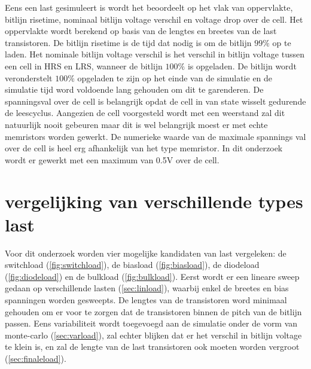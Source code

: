 Eens een last gesimuleert is wordt het beoordeelt op het vlak van oppervlakte, bitlijn risetime, nominaal bitlijn voltage verschil en voltage drop over de cell. Het oppervlakte wordt berekend op basis van de lengtes en breetes van de last transistoren. De bitlijn risetime is de tijd dat nodig is om de bitlijn $99\%$ op te laden. Het nominale bitlijn voltage verschil is het verschil in bitlijn voltage tussen een cell in HRS en LRS, wanneer de bitlijn $100\%$ is opgeladen. De bitlijn wordt veronderstelt $100\%$ opgeladen te zijn op het einde van de simulatie en de simulatie tijd word voldoende lang gehouden om dit te garenderen. De spanningsval over de cell is belangrijk opdat de cell in van state wisselt gedurende de leescyclus. Aangezien de cell voorgesteld wordt met een weerstand zal dit natuurlijk nooit gebeuren maar dit is wel belangrijk moest er met echte memristors worden gewerkt. De numerieke waarde van de maximale spannings val over de cell is heel erg afhankelijk van het type memristor. In dit onderzoek wordt er gewerkt met een maximum van 0.5V over de cell.

\section{vergelijking van verschillende types last}
Voor dit onderzoek worden vier mogelijke kandidaten van last vergeleken: de switchload (\ref{fig:switchload}), de biasload (\ref{fig:biasload}), de diodeload (\ref{fig:diodeload}) en de bulkload (\ref{fig:bulkload})\cite{bulkload}. Eerst wordt er een lineare sweep gedaan op verschillende lasten (\ref{sec:linload}), waarbij enkel de breetes en bias spanningen worden gesweepts. De lengtes van de transistoren word minimaal gehouden om er voor te zorgen dat de transistoren binnen de pitch van de bitlijn passen. Eens variabiliteit wordt toegevoegd aan de simulatie onder de vorm van monte-carlo (\ref{sec:varload}), zal echter blijken dat er het verschil in bitlijn voltage te klein is, en zal de lengte van de last transistoren ook moeten worden vergroot (\ref{sec:finaleload}).

